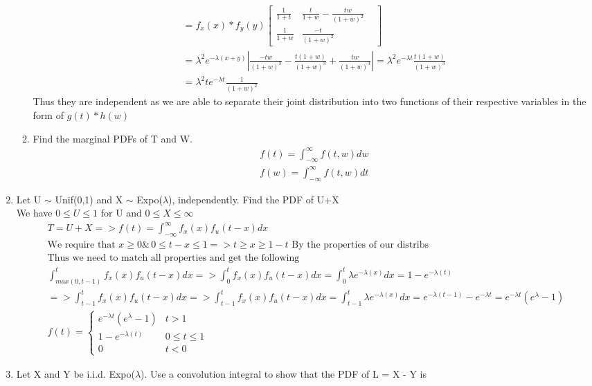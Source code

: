 \documentclass[11pt]{article}
\begin{document}
\begin{enumerate}
\begin{enumerate}
\begin{gather}
		= f_x(x) * f_y(y) \begin{bmatrix}
		\frac{1}{1+t} & 
		\frac{t}{1+w} - \frac{tw}{(1+w)^2} \\
		\frac{1}{1+w} & 
		\frac{-t}{(1+w)^2} & 
		\end{bmatrix}\\
		= \lambda^2e^{-\lambda(x+y)} |\frac{-tw}{(1+w)^3} - \frac{t(1+w)}{(1+w)^3} + \frac{tw}{(1+w)^3}| = \lambda^2e^{-\lambda t}\frac{t(1+w)}{(1+w)^3}\\
		=\lambda^2te^{-\lambda t}\frac{1}{(1+w)^2}
	\end{gather}
	Thus they are independent as we are able to separate their joint distribution into two functions of their respective variables in the form of $g(t)*h(w)$
	\item Find the marginal PDFs of T and W.
	\begin{gather}
		f(t) = \int_{-\infty}^{\infty} f(t,w) dw\\
		f(w) = \int_{-\infty}^{\infty} f(t,w) dt
	\end{gather}
\end{enumerate}
\item Let U $\sim$ Unif(0,1) and X $\sim$ Expo($\lambda$), independently. Find the PDF of U+X \\
We have $0 \le U \le 1$ for U and $0\le X \le \infty$
\begin{gather}
	T=U+X=>f(t)=\int_{-\infty}^{\infty}f_x(x)f_u(t-x)dx \\
	\text{We require that } x\ge0 \& \, 0\le t-x\le 1 => t\ge x\ge 1-t \text{ By the properties of our distribs} \\
	\text{Thus we need to match all properties and get the following}\\
	\int_{max(0,t-1)}^{t}f_x(x)f_u(t-x)dx => \int_{0}^{t}f_x(x)f_u(t-x)dx = \int_{0}^{t} \lambda e^{-\lambda(x)} dx = 1- e^{-\lambda(t)}\\
	=>\int_{t-1}^{t}f_x(x)f_u(t-x)dx => \int_{t-1}^{t}f_x(x)f_u(t-x)dx = \int_{t-1}^{t} \lambda e^{-\lambda(x)} dx = e^{-\lambda(t-1)}- e^{-\lambda t} = e^{-\lambda t}(e^\lambda -1)\\
	f(t)=\begin{cases}
	e^{-\lambda t}(e^\lambda -1) & t > 1 \\
	1- e^{-\lambda(t)} & 0\le t \le 1 \\
	0 &t<0
	\end{cases}
\end{gather}
\item Let X and Y be i.i.d. Expo($\lambda$). Use a convolution integral to show that the PDF of L = X - Y is

\end{enumerate}
\end{document}
